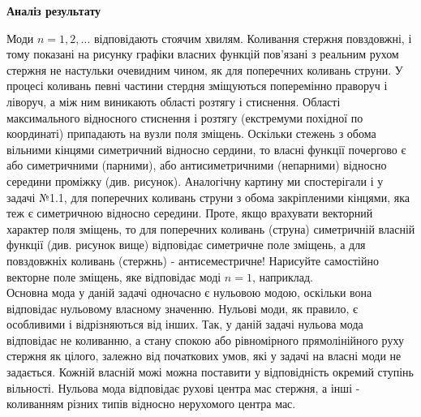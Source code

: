 \begin{center}
    \large{\textbf{Аналіз результату}}
\end{center}
Моди $n=1,2,\ldots$ відповідають стоячим хвилям. Коливання стержня повздовжні, і тому показані на рисунку графіки власних функцій пов'язані з реальним рухом стержня не настульки очевидним чином, як для поперечних коливань струни. У процесі коливань певні частини стердня зміщуються поперемінно праворуч і ліворуч, а між ним виникають області розтягу і стиснення.  Області максимального відносного стиснення і розтягу (екстремуми похідної по координаті) припадають на вузли поля зміщень. Оскільки стежень з обома вільними кінцями симетричний відносно сердини, то власні функції почергово є або симетричними (парними), або антисиметричними (непарними) відносно середини проміжку (див. рисунок). Аналогічну картину ми спостерігали і у задачі №1.1, для поперечних коливань струни з обома закріпленими кінцями, яка теж є симетричною відносно середини. Проте, якщо врахувати векторний характер поля зміщень, то для поперечних коливань (струна) симетричній власній функції (див. рисунок вище) відповідає симетричне поле зміщень, а для повздовжніх коливань (стержнь) - антисеместричне! Нарисуйте самостійно векторне поле зміщень, яке відповідає моді $n = 1$, наприклад. \\
Основна мода у даній задачі одночасно є нульовою модою, оскільки вона відповідає нульовому власному значенню. Нульові моди, як правило, є особливими і відрізняються від інших. Так, у даній задачі нульова мода відповідає не коливанню, а стану спокою або рівномірного прямолінійного руху стержня як цілого, залежно від початкових умов, які у задачі на власні моди не задається. Кожній власній можі можна поставити у відповідність окремий ступінь вільності. Нульова мода відповідає рухові центра мас стержня, а інші - коливанням різних типів відносно нерухомого центра мас. 

%